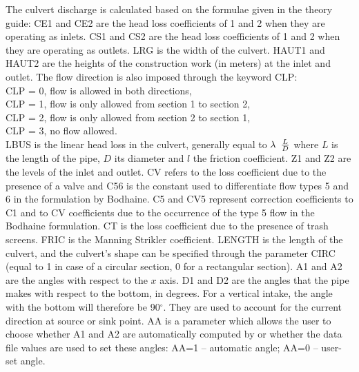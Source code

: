 The culvert discharge is calculated based on the formulae given
in the  theory guide:
CE1 and CE2 are the head loss coefficients of 1 and 2 when they are operating as
inlets.
CS1 and CS2 are the head loss coefficients of 1 and 2 when they are operating as
outlets.
LRG is the width of the culvert.
HAUT1 and HAUT2 are the heights of the construction work (in meters)
at the inlet and outlet.
The flow direction is also imposed through the keyword CLP:\\
CLP = 0, flow is allowed in both directions,\\
CLP = 1, flow is only allowed from section 1 to section 2,\\
CLP = 2, flow is only allowed from section 2 to section 1,\\
CLP = 3, no flow allowed.\\
LBUS is the linear head loss in the culvert, generally equal to
$\lambda {\kern 1pt} {\kern 1pt} {\kern 1pt} {\kern 1pt} {\kern 1pt} \frac{L}{D} $
where $L$ is the length of the pipe, $D$ its diameter and $l$ the friction
coefficient.
Z1 and Z2 are the levels of the inlet and outlet.
CV refers to the loss coefficient due to the presence of a valve and
C56 is the constant used to differentiate flow types 5 and 6 in the formulation
by Bodhaine.
C5 and CV5 represent correction coefficients to C1 and to CV coefficients 
due to the occurrence of the type 5 flow in the Bodhaine formulation.
CT is the loss coefficient due to the presence of trash screens.
FRIC is the Manning Strikler coefficient.
LENGTH is the length of the culvert, and the culvert's shape can be specified
through the parameter CIRC (equal to 1 in 
case of a circular section, 0 for a rectangular section).
A1 and A2 are the angles with respect to the $x$ axis. 
D1 and D2 are the angles that the pipe makes with respect to the bottom,
in degrees.
For a vertical intake, the angle with the bottom will therefore be 90$^\circ$.
They are used to account for the current direction at source or sink point.
AA is a parameter which allows the user to choose whether A1 and A2 are
automatically computed by 
or whether the data file values are used to set these angles:
AA=1 -- automatic angle; AA=0 -- user-set angle.



